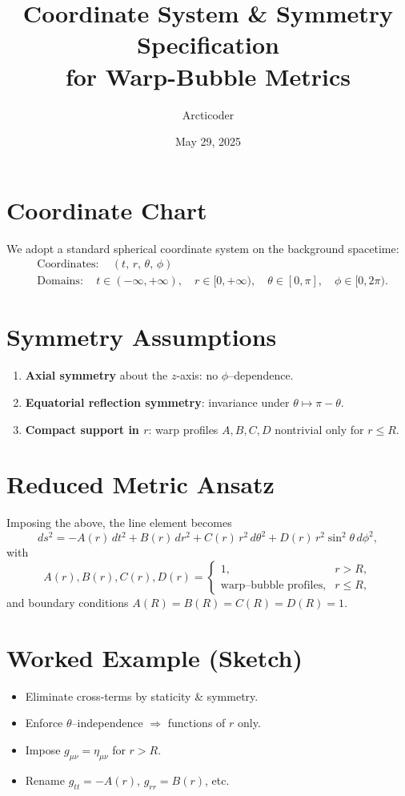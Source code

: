 \documentclass[11pt]{article}
\title{Coordinate System \& Symmetry Specification\\for Warp-Bubble Metrics}
\author{Arcticoder}
\date{May 29, 2025}
\begin{document}
\maketitle

\section{Coordinate Chart}
We adopt a standard spherical coordinate system on the background spacetime:
\begin{align*}
  &\mathrm{Coordinates:}\quad (t,\,r,\,\theta,\,\phi) \\
  &\mathrm{Domains:}\quad
    t \in (-\infty, +\infty),\quad
    r \in [0, +\infty),\quad
    \theta \in [0,\pi],\quad
    \phi \in [0,2\pi).
\end{align*}

\section{Symmetry Assumptions}
\begin{enumerate}
  \item \textbf{Axial symmetry} about the $z$-axis: no $\phi$–dependence.
  \item \textbf{Equatorial reflection symmetry}: invariance under $\theta\!\mapsto\!\pi-\theta$.
  \item \textbf{Compact support in $r$}: warp profiles $A,B,C,D$ nontrivial only for $r\le R$.
\end{enumerate}

\section{Reduced Metric Ansatz}
Imposing the above, the line element becomes
\[
  ds^2 = -A(r)\,dt^2 + B(r)\,dr^2
      + C(r)\,r^2\,d\theta^2
        + D(r)\,r^2\sin^2\theta\,d\phi^2,
\]
with
\[
  A(r),B(r),C(r),D(r) = 
  \begin{cases}
    1, & r>R,\\
    \text{warp–bubble profiles}, & r\le R,
  \end{cases}
\]
and boundary conditions $A(R)=B(R)=C(R)=D(R)=1$.

\section{Worked Example (Sketch)}
\begin{itemize}
  \item Eliminate cross‐terms by staticity \& symmetry.
  \item Enforce $\theta$–independence $\Rightarrow$ functions of $r$ only.
  \item Impose $g_{\mu\nu}=\eta_{\mu\nu}$ for $r>R$.
  \item Rename $g_{tt}=-A(r)$, $g_{rr}=B(r)$, etc.
\end{itemize}
\end{document}

